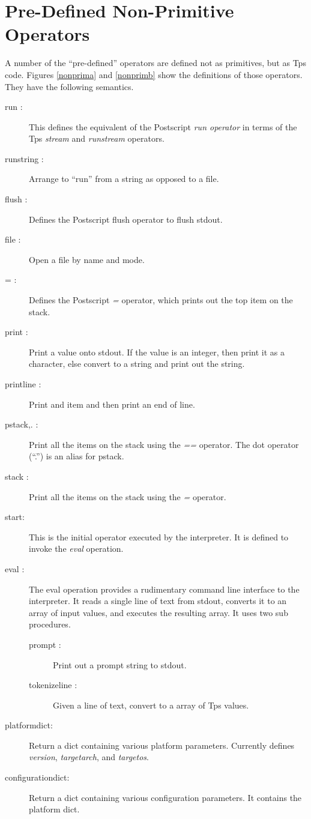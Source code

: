 \section{Pre-Defined Non-Primitive Operators}
\label{nonprimops}
A number of the ``pre-defined'' operators are defined
not as primitives, but as Tps code.
Figures \ref{nonprima} and \ref{nonprimb}
show the definitions of those operators.
They have the following semantics.
\begin{description}
\item[run :]
This defines the equivalent of the Postscript {\em run operator}
in terms of the Tps {\em stream} and {\em runstream} operators.
\item[runstring :]
Arrange to ``run'' from a string as opposed to a file.
\item[flush :]
Defines the Postscript flush operator to flush stdout.
\item[file :]
Open a file by name and mode.
\item[= :]
Defines the Postscript {\em =} operator, which prints out the
top item on the stack.
\item[print :]
Print a value onto stdout.  If the value is an integer, 
then print it as a character, else convert to a string
and print out the string.
\item[printline :]
Print and item and then print an end of line.
\item[pstack,. :]
Print all the items on the stack using the {\em ==} operator.
The dot operator (``.'') is an alias for pstack.
\item[stack :]
Print all the items on the stack using the {\em =} operator.
\item[start:]
This is the initial operator executed by the interpreter.
It is defined to invoke the {\em eval} operation.
\item[eval :]
The eval operation provides a rudimentary
command line interface to the interpreter.
It reads a single line of text from stdout, converts it to an array of
input values, and executes the resulting array.
It uses two sub procedures.
    \begin{description}
	\item[prompt :]
	Print out a prompt string to stdout.
	\item[tokenizeline :]
	Given a line of text, convert to a array of Tps values.
    \end{description}
\item[platformdict:]
Return a dict containing various platform parameters.
Currently defines {\em version}, {\em targetarch}, and {\em targetos}.
\item[configurationdict:]
Return a dict containing various configuration parameters.
It contains the platform dict.
\end{description}

